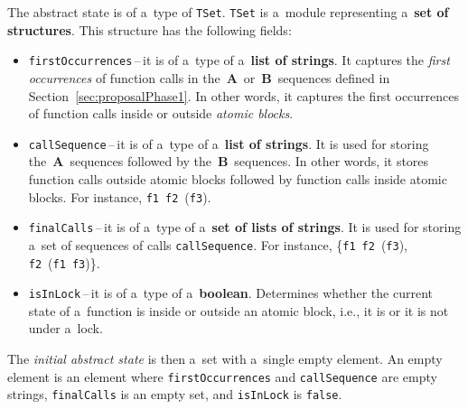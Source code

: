 The abstract state is of a~type of \texttt{TSet}. \texttt{TSet} is a~module
representing a~\textbf{set of structures}. This structure has the following
fields:
\begin{itemize}
    \item
        \texttt{firstOccurrences}\,--\,it is of a~type of a~\textbf{list of
        strings}. It captures the \emph{first occurrences} of function calls
        in the~\textbf{A}~or~\textbf{B}~sequences defined in
        Section~\ref{sec:proposalPhase1}. In other words, it captures
        the first occurrences of function calls inside or outside
        \emph{atomic blocks}.

    \item
        \texttt{callSequence}\,--\,it is of a~type of a~\textbf{list of
        strings}. It is used for storing the~\textbf{A}~sequences
        followed by the~\textbf{B}~sequences. In other words, it stores
        function calls outside atomic blocks followed by function calls
        inside atomic blocks.
        For instance, \texttt{f1}~\texttt{f2}~(\texttt{f3}).

    \item
        \texttt{finalCalls}\,--\,it is of a~type of a~\textbf{set of lists
        of strings}. It is used for storing a~set of sequences of calls
        \texttt{callSequence}. For instance,
        \{\texttt{f1}~\texttt{f2}~(\texttt{f3}),
        \texttt{f2}~(\texttt{f1}~\texttt{f3})\}.

    \item
        \texttt{isInLock}\,--\,it is of a~type of a~\textbf{boolean}. Determines
        whether the current state of a~function is inside or outside
        an atomic block, i.e., it is or it is not under a~lock.
\end{itemize}
The \emph{initial abstract state} is then a~set with a~single empty element.
An empty element is an element where \texttt{firstOccurrences} and
\texttt{callSequence} are empty strings, \texttt{finalCalls} is an empty set,
and \texttt{isInLock} is \texttt{false}.

